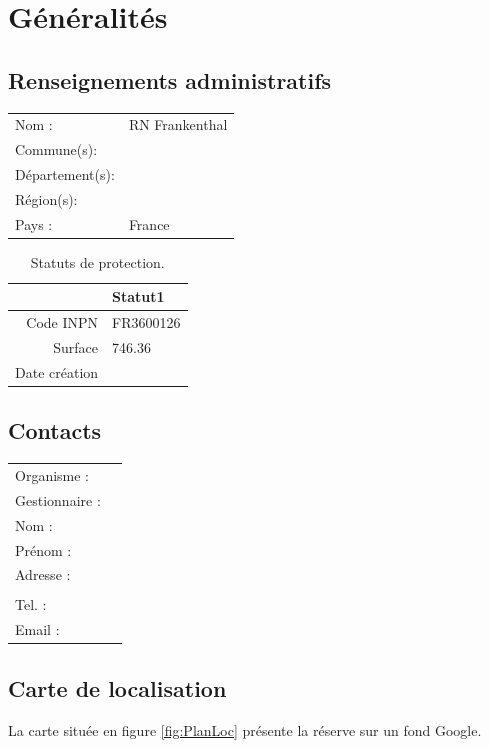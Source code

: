 \documentclass[a4paper]{book}\usepackage[]{graphicx}\usepackage[]{color}
\begin{document}
\section{Généralités}

\subsection{Renseignements administratifs}

\begin{tabular}{ll}
Nom : & RN Frankenthal \\
Commune(s): & \\
Département(s): & \\
Région(s): & \\
Pays : & France\\

\end{tabular}

\begin{table}[ht]
\centering
{\footnotesize
\begin{tabular}{rl}
  \hline
 & Statut1 \\ 
  \hline
Code INPN & FR3600126 \\ 
  Surface & 746.36 \\ 
  Date création &  \\ 
   \hline
\end{tabular}
}
\caption{Statuts de protection.} 
\label{Statuts}
\end{table}



\subsection{Contacts}
\begin{tabular}{ll}
Organisme : & \\
Gestionnaire : & \\
Nom : & \\
Prénom : & \\
Adresse : & \\
  & \\
Tel. : & \\
Email : & \\
\end{tabular}

\newpage
\subsection{Carte de localisation}
La carte située en figure \ref{fig:PlanLoc} présente la réserve sur un fond Google.
\end{document}
